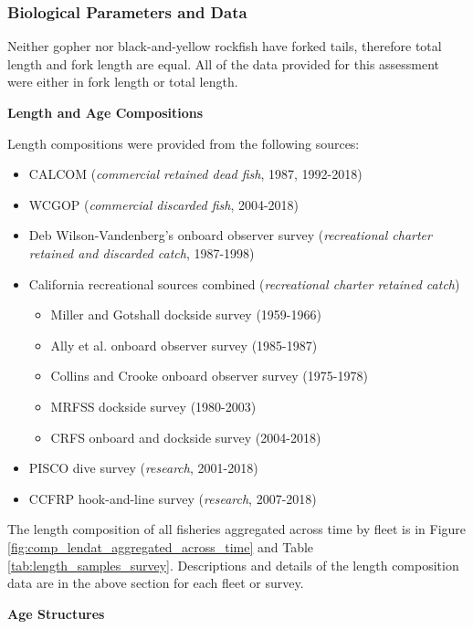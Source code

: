 \documentclass[12pt,]{article}
\begin{document}
\subsubsection{Biological Parameters and
Data}\label{biological-parameters-and-data}

Neither gopher nor black-and-yellow rockfish have forked tails,
therefore total length and fork length are equal. All of the data
provided for this assessment were either in fork length or total length.

\textbf{Length and Age Compositions}

Length compositions were provided from the following sources:

\begin{itemize}[noitemsep,nolistsep,topsep=0pt]
  \item CALCOM (\emph{commercial retained dead fish}, 1987, 1992-2018)   
  \item WCGOP (\emph{commercial discarded fish}, 2004-2018)    
  \item Deb Wilson-Vandenberg's onboard observer survey (\emph{recreational charter retained and discarded catch}, 1987-1998)
  \item California recreational sources combined (\emph{recreational charter retained catch})     
    \begin{itemize}[noitemsep,nolistsep]
      \item Miller and Gotshall dockside survey (1959-1966)    
      \item Ally  et al. onboard observer survey (1985-1987)
      \item Collins and Crooke onboard observer survey (1975-1978)     
      \item MRFSS dockside survey (1980-2003)     
      \item CRFS onboard and dockside survey (2004-2018)
    \end{itemize}
 \item PISCO dive survey (\emph{research}, 2001-2018)      
 \item CCFRP hook-and-line survey (\emph{research}, 2007-2018)        
\end{itemize}

The length composition of all fisheries aggregated across time by fleet
is in Figure \ref{fig:comp_lendat_aggregated_across_time} and Table
\ref{tab:length_samples_survey}. Descriptions and details of the length
composition data are in the above section for each fleet or survey.

\vspace{.5cm} \textbf{Age Structures}
\end{document}
